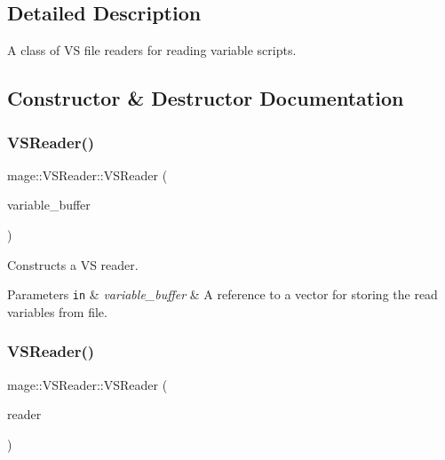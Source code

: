 \subsection{Detailed Description}
A class of VS file readers for reading variable scripts. 

\subsection{Constructor \& Destructor Documentation}
\hypertarget{classmage_1_1_v_s_reader_ab41fb08f6e7a72b0ba7059ecb8c91623}{}\label{classmage_1_1_v_s_reader_ab41fb08f6e7a72b0ba7059ecb8c91623} 
\subsubsection{\texorpdfstring{V\+S\+Reader()}{VSReader()}\hspace{0.1cm}{\footnotesize\ttfamily [1/3]}}
{\footnotesize\ttfamily mage\+::\+V\+S\+Reader\+::\+V\+S\+Reader (\begin{DoxyParamCaption}\item[{vector$<$ \hyperlink{structmage_1_1_variable}{Variable} $>$ \&}]{variable\+\_\+buffer }\end{DoxyParamCaption})\hspace{0.3cm}{\ttfamily [explicit]}}

Constructs a VS reader.


\begin{DoxyParams}[1]{Parameters}
\mbox{\tt in}  & {\em variable\+\_\+buffer} & A reference to a vector for storing the read variables from file. \\
\hline
\end{DoxyParams}
\hypertarget{classmage_1_1_v_s_reader_aec7ec2ea03d5d77c5e78438a60263a73}{}\label{classmage_1_1_v_s_reader_aec7ec2ea03d5d77c5e78438a60263a73} 
\subsubsection{\texorpdfstring{V\+S\+Reader()}{VSReader()}\hspace{0.1cm}{\footnotesize\ttfamily [2/3]}}
{\footnotesize\ttfamily mage\+::\+V\+S\+Reader\+::\+V\+S\+Reader (\begin{DoxyParamCaption}\item[{const \hyperlink{classmage_1_1_v_s_reader}{V\+S\+Reader} \&}]{reader }\end{DoxyParamCaption})\hspace{0.3cm}{\ttfamily [delete]}}

